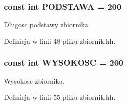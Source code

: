 \subsubsection[{P\+O\+D\+S\+T\+A\+W\+A}]{\setlength{\rightskip}{0pt plus 5cm}const int P\+O\+D\+S\+T\+A\+W\+A = 200}\label{zbiornik_8hh_acd3c5814c051e565bf7854f6403acf49}
Dlugosc podstawy zbiornika. 

Definicja w linii 48 pliku zbiornik.\+hh.

\hypertarget{zbiornik_8hh_a073767f0ac7dbf009a42b00de1092b52}{}
\subsubsection[{W\+Y\+S\+O\+K\+O\+S\+C}]{\setlength{\rightskip}{0pt plus 5cm}const int W\+Y\+S\+O\+K\+O\+S\+C = 200}\label{zbiornik_8hh_a073767f0ac7dbf009a42b00de1092b52}
Wysokosc zbiornika. 

Definicja w linii 55 pliku zbiornik.\+hh.

